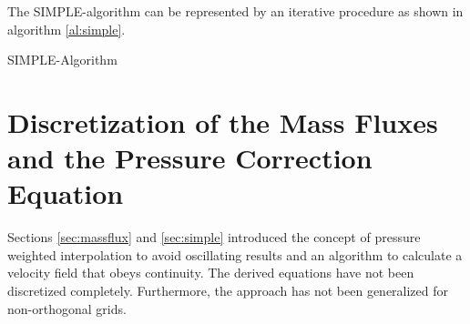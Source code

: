 The SIMPLE-algorithm can be represented by an iterative procedure as shown in algorithm \ref{al:simple}.
\begin{algorithm}
\label{al:simple}
\caption{SIMPLE-Algorithm}
\begin{algorithmic}
  \EndIf
\EndWhile
{}
  \EndIf
\end{algorithmic}
\end{algorithm}

\section{Discretization of the Mass Fluxes and the Pressure Correction Equation}
\label{sec:segpresscorr}

Sections \ref{sec:massflux} and \ref{sec:simple} introduced the concept of pressure weighted interpolation to avoid oscillating results and an algorithm to calculate a velocity field that obeys continuity. The derived equations have not been discretized completely. Furthermore, the approach has not been generalized for non-orthogonal grids.

